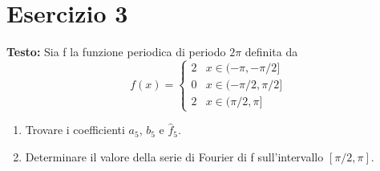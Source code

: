 \documentclass[12pt, a4paper]{article}
\begin{document}
\newpage

\section*{Esercizio 3}

\textbf{Testo:} Sia f la funzione periodica di periodo $2\pi$ definita da
\[ f(x) = \begin{cases} 2 & x \in (-\pi, -\pi/2] \\ 0 & x \in (-\pi/2, \pi/2] \\ 2 & x \in (\pi/2, \pi] \end{cases} \]
\begin{enumerate}
    \item Trovare i coefficienti $a_{5}$, $b_{5}$ e $\hat{f}_{5}$.
    \item Determinare il valore della serie di Fourier di f sull'intervallo $[\pi/2, \pi]$.
\end{enumerate}
\end{document}
